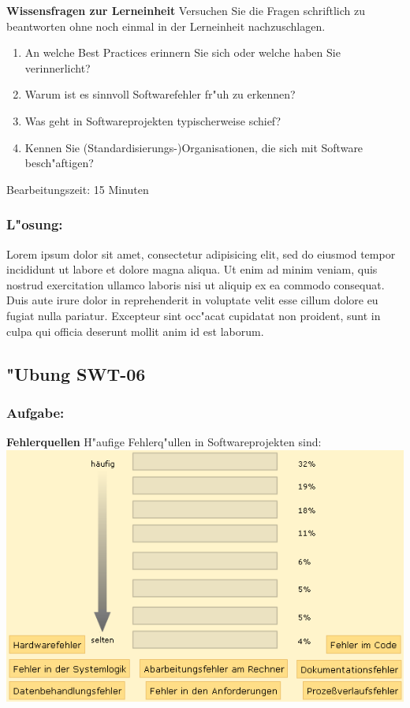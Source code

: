 \begin{framed}
\textbf{Wissensfragen zur Lerneinheit}
\smallbreak
Versuchen Sie die Fragen schriftlich zu beantworten ohne noch einmal in der Lerneinheit nachzuschlagen.
\begin{enumerate}
\item An welche Best Practices erinnern Sie sich oder welche haben Sie verinnerlicht?
\item Warum ist es sinnvoll Softwarefehler fr"uh zu erkennen?
\item Was geht in Softwareprojekten typischerweise schief?
\item Kennen Sie (Standardisierungs-)Organisationen, die sich mit Software besch"aftigen?
\end{enumerate}
\bigbreak
\small Bearbeitungszeit: 15 Minuten
\end{framed}
\bigbreak
\bigbreak
\subsubsection*{L"osung:}
Lorem ipsum dolor sit amet, consectetur adipisicing elit, sed do eiusmod tempor incididunt ut labore et dolore magna aliqua. Ut enim ad minim veniam, quis nostrud exercitation ullamco laboris nisi ut aliquip ex ea commodo consequat. Duis aute irure dolor in reprehenderit in voluptate velit esse cillum dolore eu fugiat nulla pariatur. Excepteur sint occ"acat cupidatat non proident, sunt in culpa qui officia deserunt mollit anim id est laborum.

\newpage
\subsection{"Ubung SWT-06}
\subsubsection*{Aufgabe:}

\begin{framed}
\textbf{Fehlerquellen}
\smallbreak
H"aufige Fehlerq"ullen in Softwareprojekten sind:
\bigbreak
\includegraphics[width=1.0\textwidth]{./images/ueb01-06.png}
\end{framed}
\bigbreak
\bigbreak
